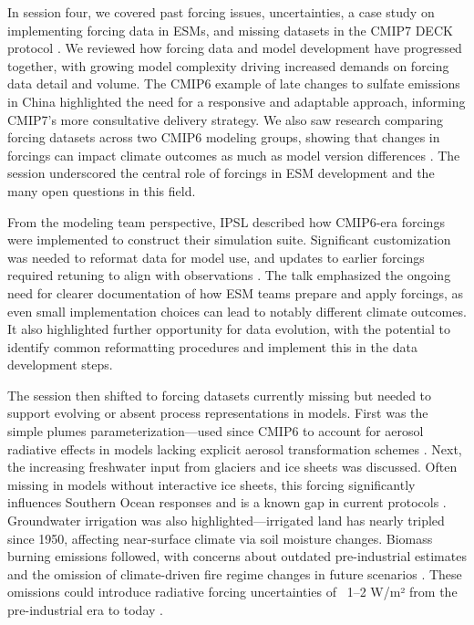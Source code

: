 \documentclass{ametsocV6.1}
\begin{document}
In session four, we covered past forcing issues, uncertainties, a case study on implementing forcing data in ESMs, and missing datasets in the CMIP7 DECK protocol \citep{dunne_evolving_2024}. We reviewed how forcing data and model development have progressed together, with growing model complexity driving increased demands on forcing data detail and volume. The CMIP6 example of late changes to sulfate emissions in China highlighted the need for a responsive and adaptable approach, informing CMIP7’s more consultative delivery strategy. We also saw research comparing forcing datasets across two CMIP6 modeling groups, showing that changes in forcings can impact climate outcomes as much as model version differences \citep{fyfe_significant_2021,holland_new_2024}. The session underscored the central role of forcings in ESM development and the many open questions in this field.

From the modeling team perspective, IPSL described how CMIP6-era forcings were implemented to construct their simulation suite. Significant customization was needed to reformat data for model use, and updates to earlier forcings required retuning to align with observations \citep{lurton_implementation_2020}. The talk emphasized the ongoing need for clearer documentation of how ESM teams prepare and apply forcings, as even small implementation choices can lead to notably different climate outcomes. It also highlighted further opportunity for data evolution, with the potential to identify common reformatting procedures and implement this in the data development steps. 

The session then shifted to forcing datasets currently missing but needed to support evolving or absent process representations in models. First was the simple plumes parameterization—used since CMIP6 to account for aerosol radiative effects in models lacking explicit aerosol transformation schemes \citep[e.g.,][]{stevens_macv2-sp_2017,fiedler_anthropogenic_2019}. Next, the increasing freshwater input from glaciers and ice sheets was discussed. Often missing in models without interactive ice sheets, this forcing significantly influences Southern Ocean responses and is a known gap in current protocols \citep[e.g.,][]{roach_winds_2023,schmidt_anomalous_2023}. Groundwater irrigation was also highlighted—irrigated land has nearly tripled since 1950, affecting near-surface climate via soil moisture changes. Biomass burning emissions followed, with concerns about outdated pre-industrial estimates and the omission of climate-driven fire regime changes in future scenarios \citep[e.g.,][]{chen_multi-decadal_2023,hamilton_global_2024}. These omissions could introduce radiative forcing uncertainties of ~1–2 W/m² from the pre-industrial era to today \citep{hamilton_reassessment_2018,wan_importance_2021}.
\end{document}
